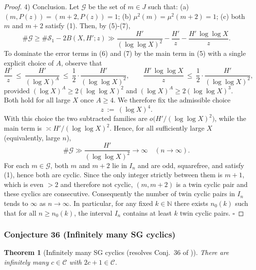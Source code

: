 \documentclass[12pt]{article}
\newtheorem{theorem}{Theorem}
\theoremstyle{remark}
\begin{document}
\begin{proof}
4) Conclusion. Let $\mathcal{G}$ be the set of $m\in J$ such that: (a) $(m,P(z))=(m+2,P(z))=1$; (b) $\mu^2(m)=\mu^2(m+2)=1$; (c) both $m$ and $m+2$ satisfy (1). Then, by (5)-(7),
$$\#\mathcal{G}\ge \#\mathcal{S}_1-2B(X,H';z)\gg \frac{H'}{(\log\log X)^2}-\frac{H'}{z}-\frac{H'\,\log\log X}{z}.$$
To dominate the error terms in (6) and (7) by the main term in (5) with a single explicit choice of $A$, observe that
\[
 \frac{H'}{z}\ \le\ \frac{H'}{(\log X)^A}\ \le\ \frac{1}{2}\cdot\frac{H'}{(\log\log X)^2},\qquad
 \frac{H'\,\log\log X}{z}\ \le\ \frac{1}{2}\cdot\frac{H'}{(\log\log X)^2},
\]
provided $(\log X)^A\ge 2(\log\log X)^2$ and $(\log X)^A\ge 2(\log\log X)^3$. Both hold for all large $X$ once $A\ge4$. We therefore fix the admissible choice
\[
 z\ :=\ (\log X)^4.
\]
With this choice the two subtracted families are $o\!\bigl(H'/(\log\log X)^2\bigr)$, while the main term is $\asymp H'/(\log\log X)^2$. Hence, for all sufficiently large $X$ (equivalently, large $n$),
$$\#\mathcal{G}\gg \frac{H'}{(\log\log X)^2}\to\infty\quad(n\to\infty).$$
For each $m\in\mathcal{G}$, both $m$ and $m+2$ lie in $I_n$ and are odd, squarefree, and satisfy (1), hence both are cyclic. Since the only integer strictly between them is $m+1$, which is even $>2$ and therefore not cyclic, $(m,m+2)$ is a twin cyclic pair and these cyclics are consecutive. Consequently the number of twin cyclic pairs in $I_n$ tends to $\infty$ as $n\to\infty$. In particular, for any fixed $k\in\mathbb N$ there exists $n_0(k)$ such that for all $n\ge n_0(k)$, the interval $I_n$ contains at least $k$ twin cyclic pairs. $\square$
\end{proof}


\subsubsection{Conjecture 36 (Infinitely many SG cyclics)}
\begin{theorem}[Infinitely many SG cyclics (resolves Conj.~36 of \cite{Cohen2025})]\label{thm:infinitely_many_sg_cyclics}
There are infinitely many \(c\in\mathcal{C}\) with \(2c+1\in\mathcal{C}\).
\end{theorem}
\end{document}
